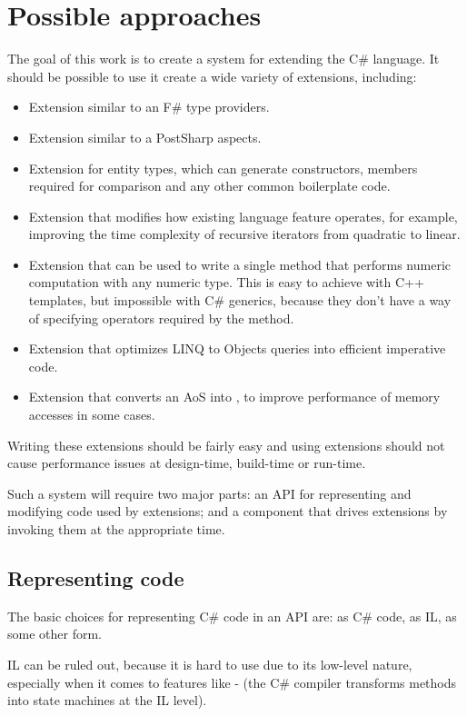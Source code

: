 \chapter{Possible approaches}

The goal of this work is to create a system for extending the C\# language. It should be possible to use it create a wide variety of extensions, including:

\begin{itemize}
\item Extension similar to an F\# type providers.
\item Extension similar to a PostSharp aspects.
\item Extension for entity types, which can generate constructors, members required for comparison and any other common boilerplate code.
\item Extension that modifies how existing language feature operates, for example, improving the time complexity of recursive iterators from quadratic to linear.
\item Extension that can be used to write a single method that performs numeric computation with any numeric type. This is easy to achieve with C++ templates, but impossible with C\# generics, because they don't have a way of specifying operators required by the method.
\item Extension that optimizes LINQ to Objects queries into efficient imperative code.
\item Extension that converts an \ac{AoS} into , to improve performance of memory accesses in some cases.
\end{itemize}

Writing these extensions should be fairly easy and using extensions should not cause performance issues at design-time, build-time or run-time.

\medskip

Such a system will require two major parts: an \ac{API} for representing and modifying code used by extensions; and a component that drives extensions by invoking them at the appropriate time.

\section{Representing code}

The basic choices for representing C\# code in an \ac{API} are: as C\# code, as \ac{IL}, as some other form.

\ac{IL} can be ruled out, because it is hard to use due to its low-level nature, especially when it comes to features like - (the C\# compiler transforms  methods into state machines at the \ac{IL} level).

